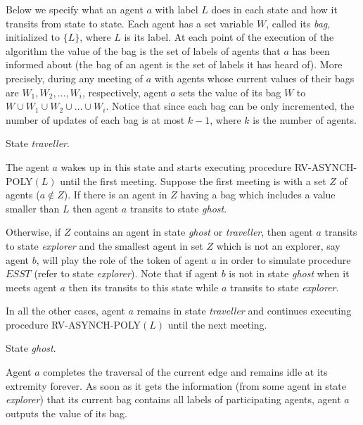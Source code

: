 \documentclass [11pt] {article}
\begin{document}
Below we specify what an agent $a$ with label $L$
does in each state and how it transits from state to state. Each agent has a set variable $W$, called its {\em bag}, initialized to $\{L\}$, where $L$ is its label. At each point of the execution of the algorithm  the value of the bag is the set of labels of agents that $a$ has been informed about {(the bag of an agent is the set of labels it has heard of)}. More precisely, during any meeting of $a$ with agents whose current values of their bags are $W_1,W_2,\dots, W_i$,
respectively, agent $a$ sets the value of its bag $W$ to $W\cup W_1 \cup W_2 \cup \dots \cup W_i$.  Notice that since each bag can be only incremented, the number of updates of each bag
is at most $k-1$, where $k$ is the number of agents.

\vspace*{0.3cm}

\noindent
State {\em traveller}.

{The agent $a$ wakes up in this state and starts executing procedure RV-ASYNCH-POLY$(L)$  until the first meeting. Suppose the first meeting is with a set $Z$ of agents ($a\notin Z$). If there is an agent in $Z$ having a bag which includes a value smaller than $L$ then agent $a$ transits to state {\em ghost}.} 

{Otherwise, if $Z$ contains an agent in state
{\em ghost} or {\em traveller}, then agent $a$ transits to state {\em explorer} and the smallest agent in set $Z$ which is not an explorer, say agent $b$, will play the role of the token of agent $a$ in order to simulate procedure $ESST$ (refer to state {\em explorer}). Note that if agent $b$ is not in state {\em ghost} when it meets agent $a$ then its transits to this state while $a$ transits to state {\em explorer}}.

{In all the other cases, agent $a$ remains in state {\em traveller} and continues executing procedure RV-ASYNCH-POLY$(L)$ until the next meeting.}

\vspace*{0.3cm}

\noindent
State {\em ghost}.

{Agent $a$ completes the traversal of the current edge and remains idle at its extremity forever.
As soon as it gets the information (from some agent in state {\em explorer}) that its current bag contains all labels of participating agents, agent $a$ outputs the value of its bag.}

\vspace*{0.3cm}
\end{document}
